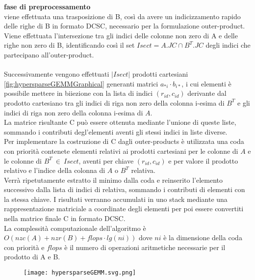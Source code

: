 {\bf fase di preprocessamento} \\
viene effettuata una trasposizione di B, così da avere un indicizzamento rapido delle righe di B
in formato DCSC, necessario per la
formulazione outer-product.\\ 
Viene effettuata l'intersezione tra gli indici delle colonne non zero di A e
delle righe non zero di B, identificando così il set $Isect = A.JC \cap B^T.JC$ degli
indici che partecipano all'outer-product.\\
\\
Successivamente vengono effettuati $|Isect|$ prodotti cartesiani \ref{fig:hypersparseGEMMGraphical} 
generanti matrici $a_{*i} \cdot b_{i*}$, i cui elementi è possibile mettere in biiezione 
con la lista di indici $(r_{id},c_{id})$ derivante dal prodotto cartesiano tra gli indici
di riga non zero della colonna i-esima di $B^T$ e gli indici di riga non zero 
della colonna i-esima di $A$.\\
La matrice risultante C può essere ottenuta mediante l'unione di queste liste,
sommando i contributi degl'elementi aventi gli stessi indici in liste
diverse.\\
Per implementare la costruzione di C dagli outer-products
è utilizzata una coda con priorità contenete elementi relativi ai
prodotti cartesiani per le colonne di $A$ e le colonne di $B^T ~\in~ Isect$, 
aventi per chiave $(r_{id},c_{id})$ e per valore il prodotto relativo e l'indice
della colonna di $A$ o $B^T$ relativa.\\
Verrà ripetutamente estratto il minimo dalla coda e reinserito
l'elemento successivo dalla lista di indici di relativa, sommando i
contributi di elementi con la stessa chiave.
I risultati verranno accumulati in uno stack mediante una rappresentazione
matriciale a coordinate degli elementi %
per poi essere convertiti nella matrice finale C in formato DCSC.\\

La complessità computazionale dell'algoritmo è $O(nzc(A) + nzr(B) +flops \cdot lg( ni))$
dove $ni$ è la dimensione della coda con priorità e $flops$ è il numero di
operazioni aritmetiche necessarie per il prodotto di A e B.\\

\begin{figure}[h]
  \centering \texttt{[image: hypersparseGEMM.svg.png]}
  \caption[Algoritmo sequenziale per SpGEMM tra matrici ipersparse] \decoRule \label{figCode:hypersparseGEMM}
\end{figure}

